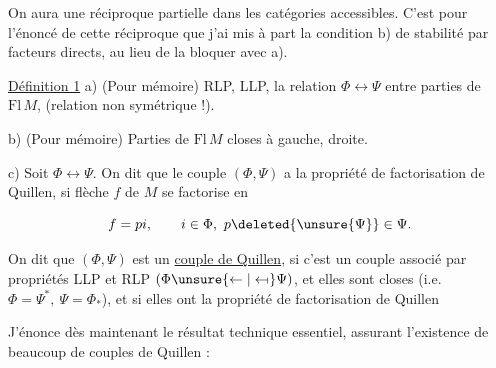 

On aura une réciproque partielle dans les catégories accessibles. C'est pour l'énoncé de cette réciproque que j'ai mis à part la condition b) de stabilité par facteurs directs, au lieu de la bloquer avec a).

\uline{Définition 1} \quad a) (Pour mémoire) RLP, LLP, la relation $\Phi\longleftrightarrow\Psi$ entre parties de $\mathrm{Fl}\,M$, (relation non symétrique !).

b) (Pour mémoire) Parties de $\mathrm{Fl}\,M$ closes à gauche,   droite.

c) Soit $\Phi\longleftrightarrow\Psi$. On dit que le couple $(\Phi,\Psi)$ a la propriété de factorisation de Quillen, si \uline{} flèche $f$ de $M$ se factorise en

\[ f=pi,\qquad i\in\Phi,\ p\deleted{\unsure{\Psi}}\in\Psi. \]

On dit que $(\Phi,\Psi)$ est un \uline{couple de Quillen}, si \deleted{\unsure{$\Phi$}} c'est un couple associé par propriétés LLP et RLP $(\Phi\unsure{\leftarrow|\leftarrow\!\shortmid}\Psi)$,  et elles sont closes (i.e. $\Phi=\Psi^*,\ \Psi=\Phi_*$), et si elles ont la propriété de factorisation de Quillen

J'énonce dès maintenant le résultat technique essentiel, assurant l'existence de beaucoup de couples de Quillen :


